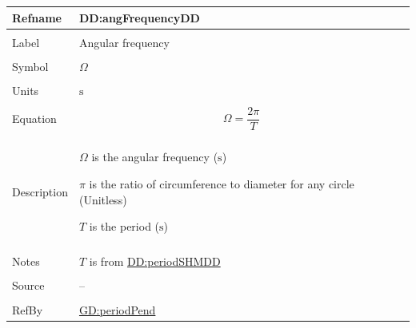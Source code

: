 \documentclass[12pt]{article}
\begin{document}
\vspace{\baselineskip}
\noindent
\begin{minipage}{\textwidth}
\begin{tabular}{>{\raggedright}p{}>{\raggedright\arraybackslash}p{}}
\toprule \textbf{Refname} & \textbf{DD:angFrequencyDD}
\label{DD:angFrequencyDD}
\\ \midrule \\
Label & Angular frequency
        
\\ \midrule \\
Symbol & $Ω$
         
\\ \midrule \\
Units & ${\text{s}}$
        
\\ \midrule \\
Equation & \begin{displaymath}
           Ω=\frac{2 π}{T}
           \end{displaymath}
\\ \midrule \\
Description & \begin{symbDescription}
              \item{$Ω$ is the angular frequency (${\text{s}}$)}
              \item{$π$ is the ratio of circumference to diameter for any circle (Unitless)}
              \item{$T$ is the period (${\text{s}}$)}
              \end{symbDescription}
\\ \midrule \\
Notes & $T$ is from \hyperref[DD:periodSHMDD]{DD:periodSHMDD}
        
\\ \midrule \\
Source & --
         
\\ \midrule \\
RefBy & \hyperref[GD:periodPend]{GD:periodPend}
        
\\ \bottomrule
\end{tabular}
\end{minipage}
\end{document}
